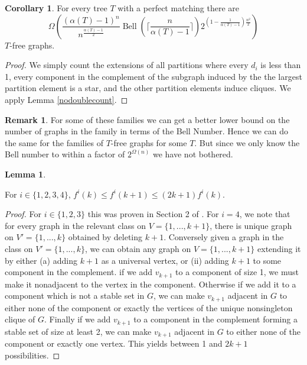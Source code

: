 \documentclass[12pt]{article}
\theoremstyle{definition}
\newtheorem{lemma}[theorem]{Lemma}
\newtheorem{corollary}[theorem]{Corollary}
\newtheorem*{remark}{Remark}
\DeclareMathOperator{\Bell}{Bell}
\begin{document}
\begin{corollary}
\label{Tfreelowerbound}
For every tree $T$  with a perfect matching there are \[\Omega\left(\frac{(\alpha(T)-1)^n}{n^{\frac{\alpha(T)-1}{2}}}\Bell( \lceil \frac{n}{\alpha(T)-1} \rceil)2^{(1-\frac{1}{\alpha(T)-1})\frac{n^2}{2}}\right)\]
$T$-free graphs. 
\end{corollary}

\begin{proof}
We simply count the extensions of  all partitions where every $d_i$ is less than 1, every component in the complement of the subgraph induced by the 
the largest partition element is a star, and the other partition elements induce cliques. We apply Lemma \ref{nodoublecount}. 
\end{proof}

\begin{remark}
For some of these families we can get a better  lower bound on the number of graphs in the family in terms of the Bell Number.  Hence we can do the same 
for the  families of $T$-free graphs for some $T$.  But since we only know the 
Bell number to within a factor of $2^{\Omega(n)}$ we have not bothered. 
\end{remark} 



\begin{lemma} \label{bellratio}

For $i \in \{1,2,3,4\}$, $f^i(k)\le f^i(k+1) \le (2k+1)f^i(k)$.

\end{lemma}

\begin{proof}
For $i \in\{1,2,3\}$ this was proven in Section 2 of \cite{R}. 
For $i=4$, we note that for every graph in the relevant class on $V=\{1,...,k+1\}$, 
there is unique graph on $V'=\{1,...,k\}$ obtained by deleting $k+1$.
Conversely given a graph in the class on $V'=\{1,...,k\}$, we can obtain any graph on 
$V=\{1,...,k+1\}$ extending it by either (a) adding $k+1$ as a universal vertex, or (ii) 
adding $k+1$ to some component in the complement.  if we add $v_{k+1}$ to a component of size 1, we must make it nonadjacent to the vertex in the component. Otherwise if we add it to a component which is not a stable set in $G$,  
we can make $v_{k+1}$  adjacent in $G$  to either none of the component or exactly the vertices of the unique  nonsingleton 
clique of $G$. Finally if we add $v_{k+1}$ to a component in the complement forming a stable set of size at least 2,
we can make $v_{k+1}$ adjacent in $G$  to either  none of the component or exactly one vertex. 
This yields between 1 and $2k+1$ possibilities. 
\end{proof}
\end{document}
